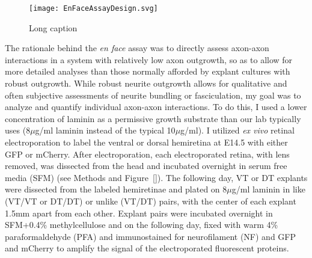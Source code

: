 \begin{figure}[hbtp]
    \begin{center}
        \texttt{[image: EnFaceAssayDesign.svg]}
        \caption[Short caption]
        {Long caption}
        \label{EnFaceAssayDesign}
    \end{center}
\end{figure}
The rationale behind the \emph{en face} assay was to directly assess axon-axon interactions in a system with relatively low axon outgrowth, so as to allow for more detailed analyses than those normally afforded by explant cultures with robust outgrowth.
While robust neurite outgrowth allows for qualitative and often subjective assessments of neurite bundling or fasciculation, my goal was to analyze and quantify individual axon-axon interactions.
To do this, I used a lower concentration of laminin as a permissive growth substrate than our lab typically uses (8$\mu$g/ml laminin instead of the typical 10$\mu$g/ml).
I utilized \emph{ex vivo} retinal electroporation \cite{petros2009utero} to label the ventral or dorsal hemiretina at E14.5 with either GFP or mCherry.
After electroporation, each electroporated retina, with lens removed, was dissected from the head and incubated overnight in serum free media (SFM) (see Methods and Figure~\ref{}).
The following day, VT or DT explants were dissected from the labeled hemiretinae and plated on 8$\mu$g/ml laminin in like (VT/VT or DT/DT) or unlike (VT/DT) pairs, with the center of each explant 1.5mm apart from each other.
Explant pairs were incubated overnight in SFM+0.4\% methylcellulose and on the following day, fixed with warm 4\% paraformaldehyde (PFA) and immunostained for neurofilament (NF) and GFP and mCherry to amplify the signal of the electroporated fluorescent proteins.




